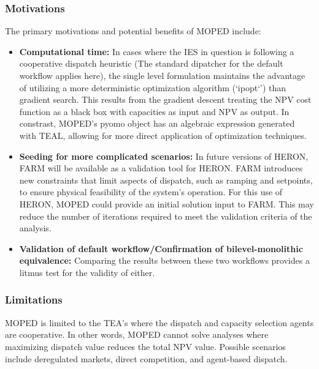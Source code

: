 \subsubsection{Motivations}
The primary motivations and potential benefits of MOPED include:
\begin{itemize}
    \item \textbf{Computational time:} In cases where the IES in question is following a cooperative dispatch heuristic (The standard dipatcher for the default workflow applies here), the single level formulation maintains the advantage of utilizing a more deterministic optimization algorithm
          (`ipopt`') than gradient search. This results from the gradient descent treating the NPV cost function as a black box with capacities as input and NPV as output. In constrast, MOPED's pyomo object has an algebraic expression generated with TEAL, allowing for more direct application of optimization techniques.
    \item \textbf{Seeding for more complicated scenarios:} In future versions of HERON, FARM will be available as a validation tool for HERON. FARM introduces new constraints that limit aspects of dispatch, such as ramping and setpoints, to ensure physical feasibility of the system's operation.
          For this use of HERON, MOPED could provide an initial solution input to FARM. This may reduce the number of iterations required to meet the validation criteria of the analysis.
    \item \textbf{Validation of default workflow/Confirmation of bilevel-monolithic equivalence:} Comparing the results between these two workflows provides a litmus test for the validity of either.
\end{itemize}

\subsubsection{Limitations}
MOPED is limited to the TEA's where the dispatch and capacity selection agents are cooperative. In other words, MOPED cannot solve analyses where maximizing dispatch value reduces the total NPV value. Possible scenarios include deregulated markets, direct competition, and agent-based dispatch.
 
